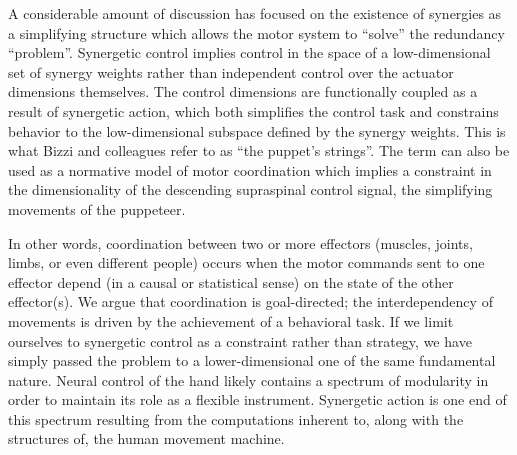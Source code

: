 \documentclass[../main.tex]{subfiles}
\begin{document}
A considerable amount of discussion has focused on the existence of synergies as a simplifying structure which allows the motor system to ``solve'' the redundancy ``problem''. Synergetic control implies control in the space of a low-dimensional set of synergy weights rather than independent control over the actuator dimensions themselves. The control dimensions are functionally coupled as a result of synergetic action, which both simplifies the control task and constrains behavior to the low-dimensional subspace defined by the synergy weights\cite{merelHierarchicalMotorControl2019}. This is what Bizzi and colleagues refer to as ``the puppet's strings''. The term can also be used as a normative model of motor coordination which implies a constraint in the dimensionality of the descending supraspinal control signal, the simplifying movements of the puppeteer.

In other words, coordination between two or more effectors (muscles, joints, limbs, or even different people) occurs when the motor commands sent to one effector depend (in a causal or statistical sense) on the state of the other effector(s). We argue that coordination is goal-directed; the interdependency of movements is driven by the achievement of a behavioral task. If we limit ourselves to synergetic control as a constraint rather than strategy, we have simply passed the problem to a lower-dimensional one of the same fundamental nature. Neural control of the hand likely contains a spectrum of modularity in order to maintain its role as a flexible instrument. Synergetic action is one end of this spectrum resulting from the computations inherent to, along with the structures of, the human movement machine.



\end{document}
